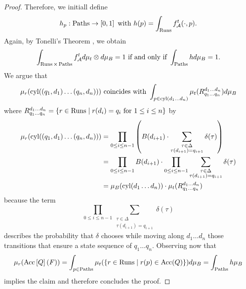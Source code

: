 \begin{proof}
  Therefore, we initiall define
  \begin{equation*}
    h_{p}:\operatorname{Paths}\rightarrow\left[0,1\right]\text{ with }
      h(p) = \int_{\operatorname{Runs}}f_{\mathcal{A}}^{t}(\cdot, p).
  \end{equation*}
  Again, by Tonelli's Theorem \cite{Bauer}, we obtain
  \begin{equation*}
    \int_{\operatorname{Runs}\times\operatorname{Paths}}f_{\mathcal{A}}^{t}d\mu_{t}\otimes d\mu_{B} = 1
    \text{ if and only if }\int_{\operatorname{Paths}}h d\mu_{B} = 1.
  \end{equation*}
  We argue that 
  \begin{equation*}
    \mu_{r}(\operatorname{cyl}(\left(q_{1}, d_{1}\right)\dots\left(q_{n}, d_{n}\right)))
    \text{ coincides with }\int_{p\in\operatorname{cyl}(d_{1}\dots d_{n})}\mu_{t}(
    R^{d_{1}\dots d_{n}}_{q_{1}\dots q_{n}})d\mu_{B}
  \end{equation*} where $R^{d_{1}\dots d_{n}}_{q_{1}\dots q_{n}} = \left\{
    r\in\operatorname{Runs}\mid r(d_{i}) = q_{i}\text{ for }1\leq i\leq n\right\}$ by
  \begin{align*}
    \mu_{r}(\operatorname{cyl}(\left(q_{1}, d_{1}\right)\dots\left(q_{n}, d_{n}\right))) &=
      \prod\limits_{0\leq i\leq n-1}\left(B(d_{i+1})\cdot\sum\limits_{
        \substack{\tau\in\Delta\\\tau(d_{i+1}) = q_{i+1}}}\delta(\tau)\right)\\
    &=\prod\limits_{0\leq i\leq n-1}B(d_{i+1})\cdot\prod
        \limits_{0\leq i\leq n-1}\sum\limits_{\substack{
        \tau\in\Delta\\\tau(d_{i+1}) = q_{i+1}}}\delta(\tau)\\
    &=\mu_{B}(\operatorname{cyl}(d_{1}\dots d_{n}))\cdot\mu_{t}(
        R^{d_{1}\dots d_{n}}_{q_{1}\dots q_{n}})\\
  \end{align*}
  because the term
  \begin{equation*}
    \prod\limits_{0\leq i\leq n-1}\sum\limits_{\substack{
    \tau\in\Delta\\\tau(d_{i+1}) = q_{i+1}}}\delta(\tau)
  \end{equation*} 
  describes the probability that $\delta$ chooses while moving along
  $d_{1}\dots d_{n}$ those transitions that ensure a state sequence  of
  $q_{1}\dots q_{n}$. Observing now that
  \begin{equation*}
    \mu_{r}(\operatorname{Acc}\left[Q\right](F)) = 
    \int_{p\in\operatorname{Paths}}\mu_{t}(\left\{r\in\operatorname{Runs}\mid r(p)\in\operatorname{Acc}(Q)\right\}) d\mu_{B} = 
    \int_{\operatorname{Paths}} h\mu_{B}
  \end{equation*}
  implies the claim and therefore concludes the proof.
\end{proof}

